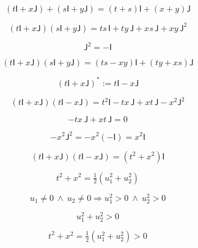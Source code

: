 \documentclass[12pt]{article}
\begin{document}
\begin{equation}
(t\mathsf{I}+x\mathsf{J})+(s\mathsf{I}+y\mathsf{J})=(t+s)\mathsf{I}+(x+y)\mathsf{J}
\end{equation}

\begin{equation}
(t\mathsf{I}+x\mathsf{J})(s\mathsf{I}+y\mathsf{J})=ts\,\mathsf{I}+ty\,\mathsf{J}+xs\,\mathsf{J}+xy\,\mathsf{J}^2
\end{equation}

\begin{equation}
\mathsf{J}^2=-\mathsf{I}
\end{equation}

\begin{equation}
(t\mathsf{I}+x\mathsf{J})(s\mathsf{I}+y\mathsf{J})=(ts-xy)\mathsf{I}+(ty+xs)\mathsf{J}
\end{equation}

\begin{equation}
(t\mathsf{I}+x\mathsf{J})^{*}:=t\mathsf{I}-x\mathsf{J}
\end{equation}

\begin{equation}
(t\mathsf{I}+x\mathsf{J})(t\mathsf{I}-x\mathsf{J})=t^2\mathsf{I}-tx\,\mathsf{J}+xt\,\mathsf{J}-x^2\mathsf{J}^2
\end{equation}

\begin{equation}
-tx\,\mathsf{J}+xt\,\mathsf{J}=0
\end{equation}

\begin{equation}
-x^2\mathsf{J}^2=-x^2(-\mathsf{I})=x^2\mathsf{I}
\end{equation}

\begin{equation}
(t\mathsf{I}+x\mathsf{J})(t\mathsf{I}-x\mathsf{J})=(t^2+x^2)\mathsf{I}
\end{equation}

\begin{equation}
t^2+x^2=\tfrac{1}{2}(u_1^2+u_2^2)
\end{equation}

\begin{equation}
u_1\neq 0\ \wedge\ u_2\neq 0\Rightarrow u_1^2>0\ \wedge\ u_2^2>0
\end{equation}

\begin{equation}
u_1^2+u_2^2>0
\end{equation}

\begin{equation}
t^2+x^2=\tfrac{1}{2}(u_1^2+u_2^2)>0
\end{equation}
\end{document}
